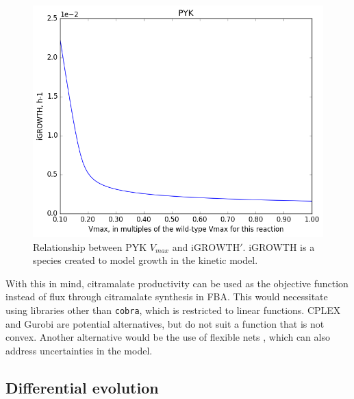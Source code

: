 \documentclass[parskip=full, numbers=noenddot]{scrreprt}
\begin{document}
\begin{figure}[h]
  \centering
  \includegraphics[scale=0.4]{issues_igrowth}
  \caption{Relationship between PYK $V_{max}$ and $\mathrm{iGROWTH}'$. iGROWTH is a species created to model growth in the kinetic model.}
  \label{fig:issues_igrowth}
\end{figure}

With this in mind, citramalate productivity can be used as the objective function instead of flux through citramalate synthesis in FBA. This would necessitate using libraries other than \texttt{cobra}, which is restricted to linear functions. CPLEX and Gurobi are potential alternatives, but do not suit a function that is not convex. Another alternative would be the use of flexible nets \citep{julvez_handling_2018}, which can also address uncertainties in the model.


\subsection{Differential evolution}
\label{ssec:discussion-kinetic-de}
\end{document}
